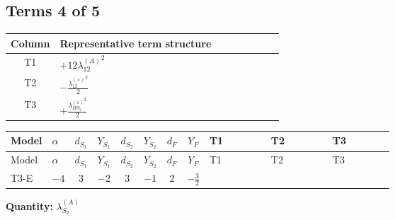 \documentclass[8pt]{article}
\begin{document}
\begin{landscape}
\subsection*{Terms 4 of 5}
\begin{center}
\begin{tabular}{@{}c >{\raggedright\arraybackslash}p{0.82\linewidth}@{}}
\toprule
Column & Representative term structure \\
\midrule
T1 & \(\displaystyle +12 {\lambda_{12}^{(A)}}^2\) \\
\midrule
T2 & \(\displaystyle -\frac{{\lambda_{12}^{(\times)}}^2}{2}\) \\
\midrule
T3 & \(\displaystyle +\frac{{\lambda_{HS_2}^{(1)}}^2}{2}\) \\
\midrule
\bottomrule
\end{tabular}
\end{center}
\smallskip
\tiny
\begin{longtable}{@{}llcccccc >{\raggedright\arraybackslash}p{0.21\linewidth} >{\raggedright\arraybackslash}p{0.21\linewidth} >{\raggedright\arraybackslash}p{0.21\linewidth}@{}}
\toprule
Model & $\alpha$ & $d_{S_1}$ & $Y_{S_1}$ & $d_{S_2}$ & $Y_{S_2}$ & $d_F$ & $Y_F$ & T1 & T2 & T3 \\
\midrule
\endfirsthead
\toprule
Model & $\alpha$ & $d_{S_1}$ & $Y_{S_1}$ & $d_{S_2}$ & $Y_{S_2}$ & $d_F$ & $Y_F$ & T1 & T2 & T3 \\
\midrule
\endhead
T3-E & $-4$ & $3$ & $-2$ & $3$ & $-1$ & $2$ & $-\frac{3}{2}$ & \scriptsize\adjustbox{max width=\linewidth}{$\begin{gathered} +12 {\lambda_{12}^{(A)}}^2\end{gathered}$} & \scriptsize\adjustbox{max width=\linewidth}{$\begin{gathered} -\frac{{\lambda_{12}^{(\times)}}^2}{2}\end{gathered}$} & \scriptsize\adjustbox{max width=\linewidth}{$\begin{gathered} +\frac{{\lambda_{HS_2}^{(1)}}^2}{2}\end{gathered}$} \\
\midrule
\bottomrule
\end{longtable}
\clearpage
\noindent\textbf{Quantity: }$\lambda_{S_2}^{(A)}$\par\smallskip

\end{landscape}
\end{document}
